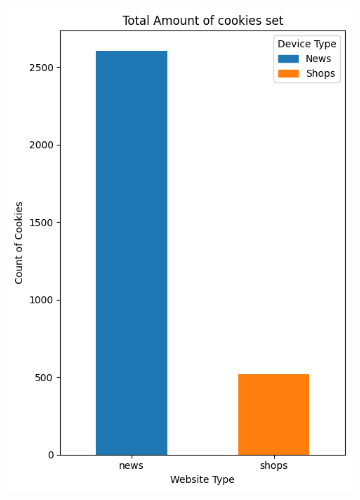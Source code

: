 \begin{figure}[h!]
\begin{subfigure}[b]{0.28\textwidth}
        \includegraphics[width=\textwidth]{./assets/comparison2.png}
        \caption{}
        \label{fig:cookies}
    \end{subfigure}
    \hfill 
    \begin{subfigure}[b]{0.28\textwidth}

\end{subfigure}
\end{figure}
